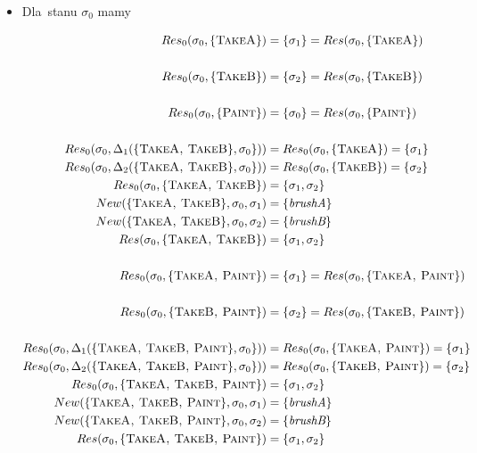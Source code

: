 \documentclass[11pt,a4paper]{article}
\begin{document}
\begin{itemize}
    \item Dla~stanu $\sigma_0$ mamy
    
    \begin{align*}
		Res_0(\sigma_0, \{ \textsc{TakeA} \}) &= \{ \sigma_1 \} = Res(\sigma_0, \{ \textsc{TakeA} \}) \\
        \\
    	Res_0(\sigma_0, \{ \textsc{TakeB} \}) &= \{ \sigma_2 \} = Res(\sigma_0, \{ \textsc{TakeB} \}) \\
    	\\
    	Res_0(\sigma_0, \{ \textsc{Paint} \}) &= \{ \sigma_0 \} = Res(\sigma_0, \{ \textsc{Paint} \}) \\
    	\\
    	Res_0(\sigma_0, \Delta_1(\{\textsc{TakeA, TakeB} \}, \sigma_0 \})) &= Res_0(\sigma_0, \{ \textsc{TakeA} \}) = \{ \sigma_1 \} \\
    	Res_0(\sigma_0, \Delta_2(\{\textsc{TakeA, TakeB} \}, \sigma_0 \})) &= Res_0(\sigma_0, \{ \textsc{TakeB} \}) = \{ \sigma_2 \} \\
		Res_0(\sigma_0, \{\textsc{TakeA, TakeB} \}) &= \{ \sigma_1, \sigma_2 \} \\  
        New(\{\textsc{TakeA, TakeB} \}, \sigma_0, \sigma_1) &=  \{ \textit{brushA} \} \\    
		New(\{\textsc{TakeA, TakeB} \}, \sigma_0, \sigma_2) &=  \{ \textit{brushB} \} \\    
        Res(\sigma_0, \{\textsc{TakeA, TakeB} \}) &= \{ \sigma_1, \sigma_2 \} \\   
        \\ 
        Res_0(\sigma_0, \{ \textsc{TakeA, Paint} \}) &= \{ \sigma_1\} = Res(\sigma_0, \{ \textsc{TakeA, Paint} \}) \\ 
        \\   
        Res_0(\sigma_0, \{ \textsc{TakeB, Paint} \}) &= \{ \sigma_2\} = Res(\sigma_0, \{ \textsc{TakeB, Paint} \}) \\     
        \\
        Res_0(\sigma_0, \Delta_1(\{\textsc{TakeA, TakeB, Paint} \}, \sigma_0 \})) &= Res_0(\sigma_0, \{ \textsc{TakeA, Paint} \}) = \{ \sigma_1 \} \\
    	Res_0(\sigma_0, \Delta_2(\{\textsc{TakeA, TakeB, Paint} \}, \sigma_0 \})) &= Res_0(\sigma_0, \{ \textsc{TakeB, Paint} \}) = \{ \sigma_2 \} \\
		Res_0(\sigma_0, \{\textsc{TakeA, TakeB, Paint} \}) &= \{ \sigma_1, \sigma_2 \} \\         
        New(\{\textsc{TakeA, TakeB, Paint} \}, \sigma_0, \sigma_1) &=  \{ \textit{brushA} \} \\    
		New(\{\textsc{TakeA, TakeB, Paint} \}, \sigma_0, \sigma_2) &=  \{ \textit{brushB} \} \\    
        Res(\sigma_0, \{\textsc{TakeA, TakeB, Paint} \}) &= \{ \sigma_1, \sigma_2 \} \\ 		
    \end{align*}


\end{itemize}
\end{document}
